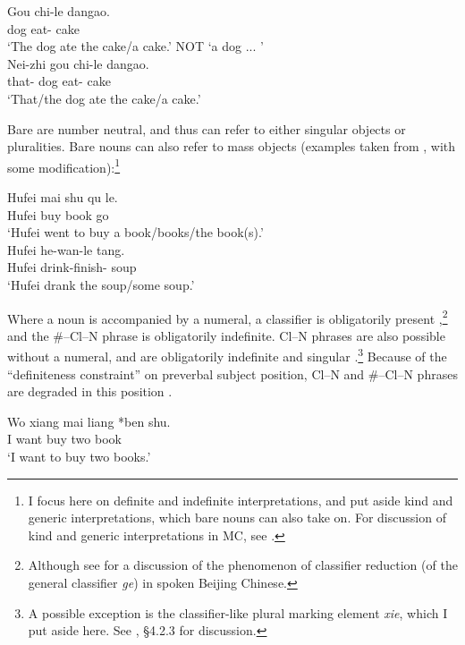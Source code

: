 \documentclass[output=paper
,modfonts
,nonflat]{langsci/langscibook}
\begin{document}
\ea \label{ex:hall:3}
\ea \label{ex:hall:3a}
\gll Gou chi-le dangao. \\
 dog eat-{} cake \\
\glt `The dog ate the cake/a cake.' NOT `a dog ... ' \\
\ex \label{ex:hall:3b}
\gll Nei-zhi gou chi-le dangao. \\
that-{} dog eat-{} cake \\
\glt `That/the dog ate the cake/a cake.' \\
\z
\z

Bare  are number neutral, and thus can refer to either singular objects or pluralities. Bare nouns can also refer to mass objects (examples taken from \citealt{ChengSybesma1999}, with some modification):\footnote{I focus here on definite and indefinite interpretations, and put aside kind and generic interpretations, which bare nouns can also take on. For discussion of kind and generic interpretations in MC, see \citet{Krifka1995}.}

\ea \label{ex:hall:4}
\ea
\gll Hufei mai shu qu le.\\
 Hufei buy book go {}\\
\glt `Hufei went to buy a book/books/the book(s).'\\

\ex
\gll Hufei he-wan-le tang.\\
 Hufei drink-finish-{} soup\\
\glt `Hufei drank the soup/some soup.'\\
\z
\z


Where a noun is accompanied by a numeral, a classifier is obligatorily present ,\footnote{Although see \citet{Tao2006} for a discussion of the phenomenon of classifier reduction (of the general classifier \textit{ge}) in spoken Beijing  Chinese.} and the \#--Cl--N phrase is obligatorily indefinite. Cl--N phrases are also possible without a numeral, and are obligatorily indefinite and singular .\footnote{A possible exception is the classifier-like plural marking element \textit{xie}, which I put aside here. See \citet{Hall2015}, \S4.2.3 for discussion.} Because of the ``definiteness constraint'' on preverbal subject position, Cl--N and \#--Cl--N phrases are degraded in this position . 

\ea \label{ex:hall:5}
\gll 
Wo xiang mai liang \textnormal{*}{\op}ben{\cp} shu.\\
I want buy two  book\\
\glt 
`I want to buy two books.'\\
\z
\end{document}
